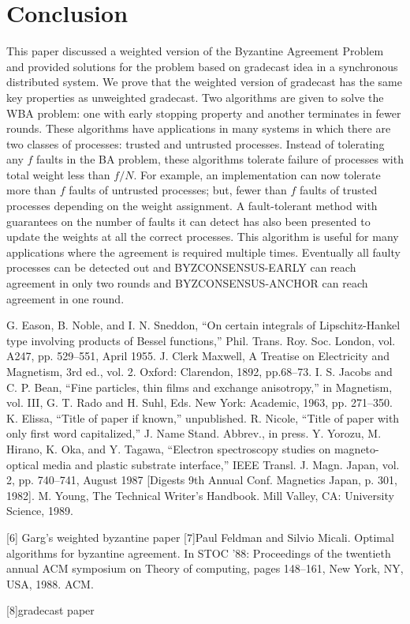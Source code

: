 \documentclass[conference]{IEEEtran}
\begin{document}
\section{Conclusion}
This paper discussed a weighted version of the Byzantine Agreement Problem and provided solutions for the problem based on gradecast idea in a synchronous distributed system. We prove that the weighted version of gradecast has the same key properties as unweighted gradecast. Two algorithms are given to solve the WBA problem: one with early stopping property and another terminates in fewer rounds. 
These algorithms have applications in many systems in which
there are two classes of processes: trusted and untrusted
processes. Instead of tolerating any $f$ faults in the BA problem,
these algorithms tolerate failure of processes with total weight
less than $f/N$. For example, an implementation can now
tolerate more than $f$ faults of untrusted processes; but, fewer
than $f$ faults of trusted processes depending on the weight
assignment. A fault-tolerant method with guarantees on the number of faults it can detect has also been presented to update the weights at all the correct processes. This algorithm is useful for many applications where the agreement is required multiple times. Eventually all faulty processes can be detected out and BYZCONSENSUS-EARLY can reach agreement in only two rounds and BYZCONSENSUS-ANCHOR can reach agreement in one round. 


\begin{thebibliography}{00}
 G. Eason, B. Noble, and I. N. Sneddon, ``On certain integrals of Lipschitz-Hankel type involving products of Bessel functions,'' Phil. Trans. Roy. Soc. London, vol. A247, pp. 529--551, April 1955.
 J. Clerk Maxwell, A Treatise on Electricity and Magnetism, 3rd ed., vol. 2. Oxford: Clarendon, 1892, pp.68--73.
 I. S. Jacobs and C. P. Bean, ``Fine particles, thin films and exchange anisotropy,'' in Magnetism, vol. III, G. T. Rado and H. Suhl, Eds. New York: Academic, 1963, pp. 271--350.
 K. Elissa, ``Title of paper if known,'' unpublished.
 R. Nicole, ``Title of paper with only first word capitalized,'' J. Name Stand. Abbrev., in press.
 Y. Yorozu, M. Hirano, K. Oka, and Y. Tagawa, ``Electron spectroscopy studies on magneto-optical media and plastic substrate interface,'' IEEE Transl. J. Magn. Japan, vol. 2, pp. 740--741, August 1987 [Digests 9th Annual Conf. Magnetics Japan, p. 301, 1982].
 M. Young, The Technical Writer's Handbook. Mill Valley, CA: University Science, 1989.
\end{thebibliography}

[6] Garg's weighted byzantine paper 
[7]Paul Feldman and Silvio Micali. Optimal algorithms for byzantine agreement. In STOC ’88:
Proceedings of the twentieth annual ACM symposium on Theory of computing, pages 148–161,
New York, NY, USA, 1988. ACM.


[8]gradecast paper
\end{document}
